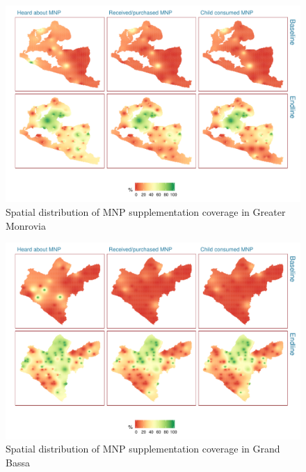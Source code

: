 \documentclass[12pt,a4paper]{article}
\begin{document}
\begin{figure}[H]

{\centering \includegraphics{liberiaCoverageFinalReport_files/figure-latex/mnp1map-1} 

}

\caption{Spatial distribution of MNP supplementation coverage in Greater Monrovia}\label{fig:mnp1map}
\end{figure}

\begin{figure}[H]

{\centering \includegraphics{liberiaCoverageFinalReport_files/figure-latex/mnp2map-1} 

}

\caption{Spatial distribution of MNP supplementation coverage in Grand Bassa}\label{fig:mnp2map}
\end{figure}

\newpage
\end{document}
